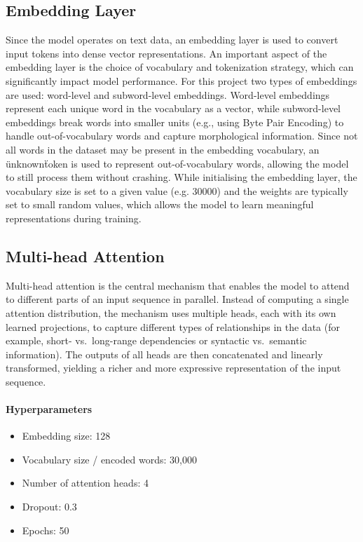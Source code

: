\documentclass[11pt,a4paper]{article}
\begin{document}
    \subsection{Embedding Layer}
    Since the model operates on text data, an embedding layer is used to convert input tokens into dense vector representations.
    An important aspect of the embedding layer is the choice of vocabulary and tokenization strategy, which can significantly impact model performance.
    For this project two types of embeddings are used: word-level and subword-level embeddings.
    Word-level embeddings represent each unique word in the vocabulary as a vector, while subword-level embeddings break words into smaller units (e.g., using Byte Pair Encoding) to handle out-of-vocabulary words and capture morphological information.
    Since not all words in the dataset may be present in the embedding vocabulary, an \"unknown\" token is used to represent out-of-vocabulary words, allowing the model to still process them without crashing. 
    While initialising the embedding layer, the vocabulary size is set to a given value (e.g. 30000) and the weights are typically set to small random values, which allows the model to learn meaningful representations during training.
   \subsection{Multi-head Attention}
    Multi-head attention is the central mechanism that enables the model to attend to different parts of an input sequence in parallel.
    Instead of computing a single attention distribution, the mechanism uses multiple heads, each with its own learned projections, to capture different types of relationships in the data (for example, short- vs.\ long-range dependencies or syntactic vs.\ semantic information).
    The outputs of all heads are then concatenated and linearly transformed, yielding a richer and more expressive representation of the input sequence.

    \paragraph{Hyperparameters}
    \begin{itemize}
        \item Embedding size: 128
        \item Vocabulary size / encoded words: 30{,}000
        \item Number of attention heads: 4
        \item Dropout: 0.3
        \item Epochs: 50
    \end{itemize}
\end{document}

